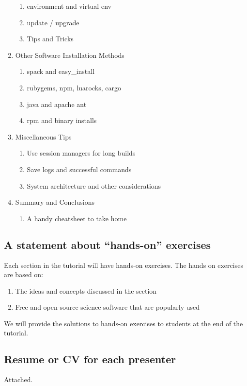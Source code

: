 \documentclass{report}
\begin{document}
\begin{enumerate}
\begin{enumerate}
    \item environment and virtual env
    \item update / upgrade
    \item Tips and Tricks
  \end{enumerate}
\item Other Software Installation Methods
    \begin{enumerate}
        \item spack and easy\_install
        \item rubygems, npm, luarocks, cargo
        \item java and apache ant 
        \item rpm and binary installs
    \end{enumerate}
\item Miscellaneous Tips
  \begin{enumerate}
    \item Use session managers for long builds
    \item Save logs and successful commands
    \item System architecture and other considerations
  \end{enumerate}
\item Summary and Conclusions
  \begin{enumerate}
    \item A handy cheatsheet to take home
  \end{enumerate}
\end{enumerate}

\subsection*{A statement about ``hands-on'' exercises}
Each section in the tutorial will have hands-on exercises. The hands on exercises are based on:
\begin{enumerate}
\item The ideas and concepts discussed in the section 
\item Free and open-source science software that are popularly used
\end{enumerate}
We will provide the solutions to hands-on exercises to students at the end of the tutorial.

\subsection*{Resume or CV for each presenter}
Attached.
\end{document}
